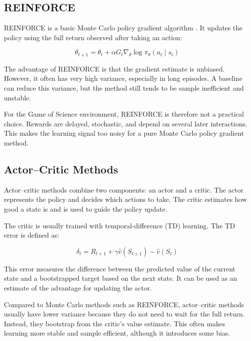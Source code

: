 \documentclass[english,bachelor]{hsluthesis}
\begin{document}
\subsection{REINFORCE}

REINFORCE is a basic Monte Carlo policy gradient algorithm \cite{sutton2018reinforcement}. It updates the policy using the full return observed after taking an action:

\begin{equation}
\theta_{t+1}
=
\theta_t
+
\alpha
G_t
\nabla_\theta \log \pi_\theta(a_t \mid s_t)
\end{equation}

The advantage of REINFORCE is that the gradient estimate is unbiased. However, it often has very high variance, especially in long episodes. A baseline can reduce this variance, but the method still tends to be sample inefficient and unstable.

For the Game of Science environment, REINFORCE is therefore not a practical choice. Rewards are delayed, stochastic, and depend on several later interactions. This makes the learning signal too noisy for a pure Monte Carlo policy gradient method.

\subsection{Actor--Critic Methods}

Actor--critic methods combine two components: an actor and a critic. The actor represents the policy and decides which actions to take. The critic estimates how good a state is and is used to guide the policy update.

The critic is usually trained with temporal-difference (TD) learning. The TD error is defined as:

\begin{equation}
\delta_t = R_{t+1} + \gamma \hat{v}(S_{t+1}) - \hat{v}(S_t)
\end{equation}

This error measures the difference between the predicted value of the current state and a bootstrapped target based on the next state. It can be used as an estimate of the advantage for updating the actor.

Compared to Monte Carlo methods such as REINFORCE, actor--critic methods usually have lower variance because they do not need to wait for the full return. Instead, they bootstrap from the critic's value estimate. This often makes learning more stable and sample efficient, although it introduces some bias.
\end{document}
